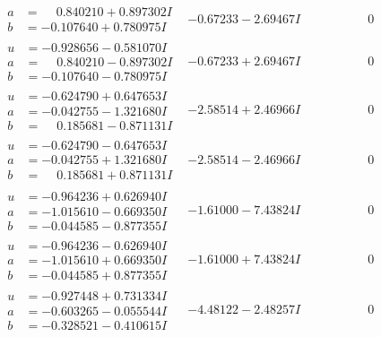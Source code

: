 \documentclass[1p]{elsarticle_modified}
\theoremstyle{definition}
\begin{document}
$$\begin{array}{c|c|c}
\begin{aligned}
a &= \phantom{-}0.840210 + 0.897302 I \\
b &= -0.107640 + 0.780975 I\end{aligned}
 & -0.67233 - 2.69467 I & \phantom{-0.000000 } 0 \\ \hline\begin{aligned}
u &= -0.928656 - 0.581070 I \\
a &= \phantom{-}0.840210 - 0.897302 I \\
b &= -0.107640 - 0.780975 I\end{aligned}
 & -0.67233 + 2.69467 I & \phantom{-0.000000 } 0 \\ \hline\begin{aligned}
u &= -0.624790 + 0.647653 I \\
a &= -0.042755 - 1.321680 I \\
b &= \phantom{-}0.185681 - 0.871131 I\end{aligned}
 & -2.58514 + 2.46966 I & \phantom{-0.000000 } 0 \\ \hline\begin{aligned}
u &= -0.624790 - 0.647653 I \\
a &= -0.042755 + 1.321680 I \\
b &= \phantom{-}0.185681 + 0.871131 I\end{aligned}
 & -2.58514 - 2.46966 I & \phantom{-0.000000 } 0 \\ \hline\begin{aligned}
u &= -0.964236 + 0.626940 I \\
a &= -1.015610 - 0.669350 I \\
b &= -0.044585 - 0.877355 I\end{aligned}
 & -1.61000 - 7.43824 I & \phantom{-0.000000 } 0 \\ \hline\begin{aligned}
u &= -0.964236 - 0.626940 I \\
a &= -1.015610 + 0.669350 I \\
b &= -0.044585 + 0.877355 I\end{aligned}
 & -1.61000 + 7.43824 I & \phantom{-0.000000 } 0 \\ \hline\begin{aligned}
u &= -0.927448 + 0.731334 I \\
a &= -0.603265 - 0.055544 I \\
b &= -0.328521 - 0.410615 I\end{aligned}
 & -4.48122 - 2.48257 I & \phantom{-0.000000 } 0 \\ \hline\begin{aligned}

\end{aligned}
\end{array}$$
\end{document}
